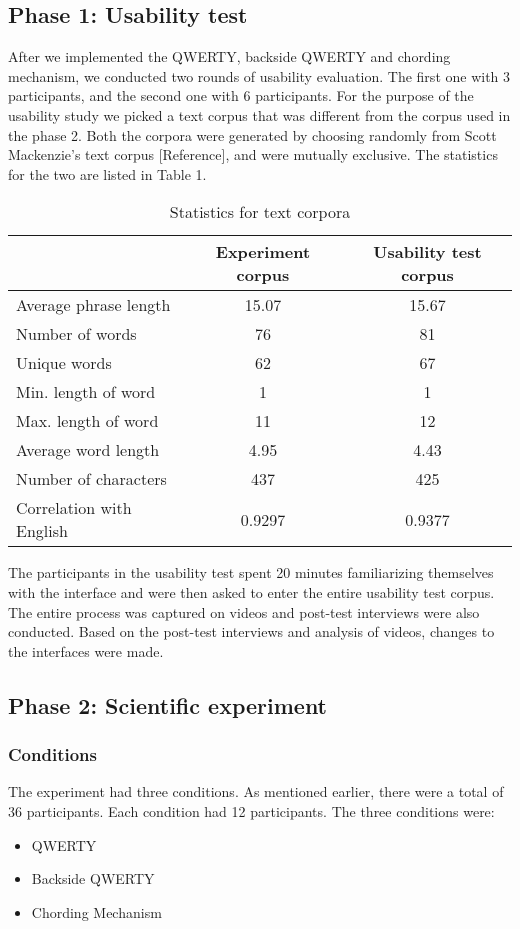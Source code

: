 \subsection{Phase 1: Usability test}
After we implemented the QWERTY, backside QWERTY and chording mechanism, we conducted two rounds of usability evaluation. The first one with 3 participants, and the second one with 6 participants. For the purpose of the usability study we picked a text corpus that was different from the corpus used in the phase 2. Both the corpora were generated by choosing randomly from Scott Mackenzie's text corpus [Reference], and were mutually exclusive. The statistics for the two are listed in Table 1.
\begin{table*}
	\centering
		\begin{tabular}{|l|c|c|} \hline
		                         & Experiment corpus & Usability test corpus \\ \hline
			 Average phrase length & 15.07 & 15.67 \\ \hline
			 Number of words & 76 & 81 \\ \hline
			 Unique words & 62 & 67 \\ \hline
			 Min. length of word & 1 & 1 \\ \hline
			 Max. length of word & 11 & 12 \\ \hline
			 Average word length & 4.95 & 4.43 \\ \hline
			 Number of characters & 437 & 425 \\ \hline
			 Correlation with English & 0.9297 & 0.9377 \\ \hline
		\end{tabular}
	\caption{Statistics for text corpora}
	\label{tab:StatisticsForTextCorpora}
\end{table*}
The participants in the usability test spent 20 minutes familiarizing themselves with the interface and were then asked to enter the entire usability test corpus. The entire process was captured on videos and post-test interviews were also conducted. Based on the post-test interviews and analysis of videos, changes to the interfaces were made.
\subsection{Phase 2: Scientific experiment}
\subsubsection{Conditions}
The experiment had three conditions. As mentioned earlier, there were a total of 36 participants. Each condition had 12 participants. The three conditions were:
\begin{itemize}
	\item QWERTY
	\item Backside QWERTY
	\item Chording Mechanism
\end{itemize}
